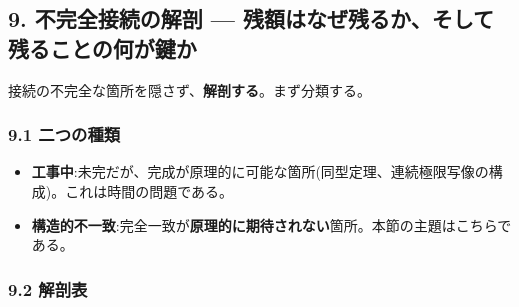 \documentclass[
]{ltjsarticle}
\providecommand{\tightlist}{%
  \setlength{\itemsep}{0pt}\setlength{\parskip}{0pt}}
\begin{document}
\subsection{9. 不完全接続の解剖 ---
残額はなぜ残るか、そして残ることの何が鍵か}\label{ux4e0dux5b8cux5168ux63a5ux7d9aux306eux89e3ux5256-ux6b8bux984dux306fux306aux305cux6b8bux308bux304bux305dux3057ux3066ux6b8bux308bux3053ux3068ux306eux4f55ux304cux9375ux304b}

接続の不完全な箇所を隠さず、\textbf{解剖する}。まず分類する。

\subsubsection{9.1 二つの種類}\label{ux4e8cux3064ux306eux7a2eux985e}

\begin{itemize}
\tightlist
\item
  \textbf{工事中}:未完だが、完成が原理的に可能な箇所(同型定理、連続極限写像の構成)。これは時間の問題である。
\item
  \textbf{構造的不一致}:完全一致が\textbf{原理的に期待されない}箇所。本節の主題はこちらである。
\end{itemize}

\subsubsection{9.2 解剖表}\label{ux89e3ux5256ux8868}
\end{document}
